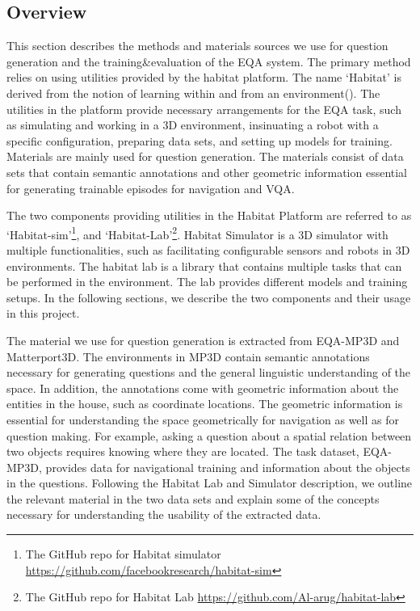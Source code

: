 \subsection{Overview}


This section describes the methods and materials sources we use for question generation and the training\&evaluation of the EQA system. The primary method relies on using utilities provided by the habitat platform. The name ‘Habitat’ is derived from the notion of learning within and from an environment(\cite{habitat19iccv}). The utilities in the platform provide necessary arrangements for the EQA task, such as simulating and working in a 3D environment, insinuating a robot with a specific configuration, preparing data sets, and setting up models for training. Materials are mainly used for question generation. The materials consist of data sets that contain semantic annotations and other geometric information essential for generating trainable episodes for navigation and VQA. 

The two components providing utilities in the Habitat Platform are referred to as ‘Habitat-sim'\footnote{ The GitHub repo for Habitat simulator \url{https://github.com/facebookresearch/habitat-sim}}, and ‘Habitat-Lab'\footnote{ The GitHub repo for Habitat Lab \url{https://github.com/Al-arug/habitat-lab}}. Habitat Simulator is a 3D simulator with multiple functionalities, such as facilitating configurable sensors and robots in 3D environments. The habitat lab is a library that contains multiple tasks that can be performed in the environment. The lab provides different models and training setups. In the following sections, we describe the two components and their usage in this project. 


The material we use for question generation is extracted from EQA-MP3D and Matterport3D. The environments in MP3D contain semantic annotations necessary for generating questions and the general linguistic understanding of the space. In addition, the annotations come with geometric information about the entities in the house, such as coordinate locations. The geometric information is essential for understanding the space geometrically for navigation as well as for question making. For example, asking a question about a spatial relation between two objects requires knowing where they are located. The task dataset,  EQA-MP3D, provides data for navigational training and information about the objects in the questions. Following the Habitat Lab and Simulator description, we outline the relevant material in the two data sets and explain some of the concepts necessary for understanding the usability of the extracted data. 



